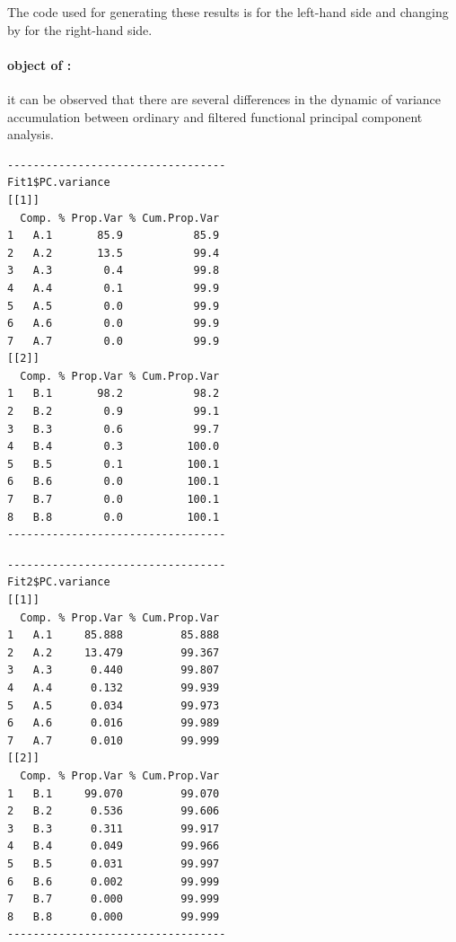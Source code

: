 \noindent The code used for generating these results is  for the left-hand side and changing  by  for the right-hand side.  

\paragraph{ object of :} it can be observed that there are several differences in the dynamic of variance accumulation between ordinary and filtered functional principal component analysis.

\noindent
\begin{minipage}[t]{.49\textwidth}
\raggedleft
\begin{verbatim}
----------------------------------
Fit1$PC.variance
[[1]]
  Comp. % Prop.Var % Cum.Prop.Var
1   A.1       85.9           85.9
2   A.2       13.5           99.4
3   A.3        0.4           99.8
4   A.4        0.1           99.9
5   A.5        0.0           99.9
6   A.6        0.0           99.9
7   A.7        0.0           99.9
[[2]]
  Comp. % Prop.Var % Cum.Prop.Var
1   B.1       98.2           98.2
2   B.2        0.9           99.1
3   B.3        0.6           99.7
4   B.4        0.3          100.0
5   B.5        0.1          100.1
6   B.6        0.0          100.1
7   B.7        0.0          100.1
8   B.8        0.0          100.1
----------------------------------
\end{verbatim}
\end{minipage}%
%
\hfill
%
\begin{minipage}[t]{.49\textwidth}
\raggedleft
\begin{verbatim}
----------------------------------
Fit2$PC.variance
[[1]]
  Comp. % Prop.Var % Cum.Prop.Var
1   A.1     85.888         85.888
2   A.2     13.479         99.367
3   A.3      0.440         99.807
4   A.4      0.132         99.939
5   A.5      0.034         99.973
6   A.6      0.016         99.989
7   A.7      0.010         99.999
[[2]]
  Comp. % Prop.Var % Cum.Prop.Var
1   B.1     99.070         99.070
2   B.2      0.536         99.606
3   B.3      0.311         99.917
4   B.4      0.049         99.966
5   B.5      0.031         99.997
6   B.6      0.002         99.999
7   B.7      0.000         99.999
8   B.8      0.000         99.999
----------------------------------
\end{verbatim}
\end{minipage}%
\label{VarAcum}



